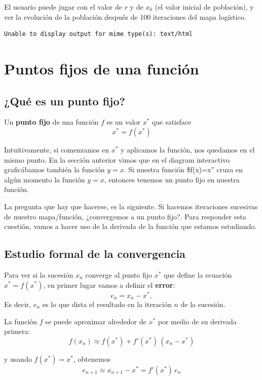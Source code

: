 \documentclass[
  10pt,
  a4paper,
  DIV=11,
  numbers=noendperiod,
  open=any]{scrreprt}
\numberwithin{equation}{chapter}
\numberwithin{equation}{chapter}
\renewcommand{\[}{\begin{equation}}
\renewcommand{\]}{\end{equation}}
\begin{document}
El usuario puede jugar con el valor de \(r\) y de \(x_0\) (el valor
inicial de población), y ver la evolución de la población después de 100
iteraciones del mapa logístico.

\begin{verbatim}
Unable to display output for mime type(s): text/html
\end{verbatim}


\chapter{Puntos fijos de una
función}\label{puntos-fijos-de-una-funciuxf3n}

\section{¿Qué es un punto fijo?}\label{quuxe9-es-un-punto-fijo}

Un \textbf{punto fijo} de una función \(f\) es un valor \(x^*\) que
satisface \[x^* = f(x^*)\]

Intuitivamente, si comenzamos en \(x^*\) y aplicamos la función, nos
quedamos en el mismo punto. En la sección anterior vimos que en el
diagram interactivo graficábamos también la función \(y=x\). Si nuestra
función \$f(x)=x'' cruza en algún momento la función \(y=x\), entonces
tenemos un punto fijo en nuestra función.

La pregunta que hay que hacerse, es la siguiente. Si hacemos iteraciones
sucesivas de nuestro mapa/función, ¿convergemos a un punto fijo?. Para
responder esta cuestión, vamos a hacer uso de la derivada de la función
que estamos estudiando.

\section{Estudio formal de la
convergencia}\label{estudio-formal-de-la-convergencia}

Para ver si la sucesión \(x_n\) converge al punto fijo \(x^*\) que
define la ecuación \(x^* = f(x^*)\), en primer lugar vamos a definir el
\textbf{error}: \[
e_n = x_n - x^*,
\] Es decir, \(e_n\) es lo que dista el resultado en la iteración \(n\)
de la sucesión.

La función \(f\) se puede aproximar alrededor de \(x^*\) por medio de su
derivada primera: \[
f(x_n) \approx f(x^*) + f'(x^*)\,(x_n - x^*) 
\]

y usando \(f(x^*)=x^*\), obtenemos \[
e_{n+1} \approx x_{n+1} - x^* = f'(x^*)\,e_n 
\]
\end{document}
